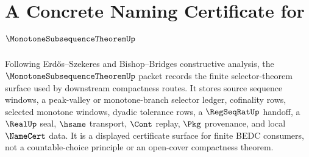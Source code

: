 \chapter{A Concrete Naming Certificate for $\MonotoneSubsequenceTheoremUp$}
\label{ch:concrete-instances-monotone-subsequence-theorem-namecert}

Following Erd\H{o}s--Szekeres and Bishop--Bridges constructive analysis, the $\MonotoneSubsequenceTheoremUp$ packet records the finite selector-theorem surface used by downstream compactness routes. It stores source sequence windows, a peak-valley or monotone-branch selector ledger, cofinality rows, selected monotone windows, dyadic tolerance rows, a $\RegSeqRatUp$ handoff, a $\RealUp$ seal, $\hsame$ transport, $\Cont$ replay, $\Pkg$ provenance, and local $\NameCert$ data. It is a displayed certificate surface for finite BEDC consumers, not a countable-choice principle or an open-cover compactness theorem.

